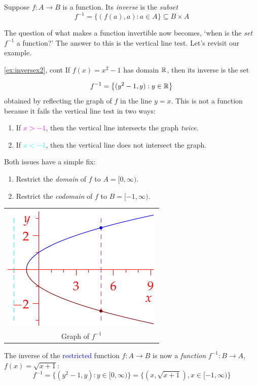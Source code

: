\begin{defn}{}{}
Suppose $f:A\to B$ is a function. Its \emph{inverse} is the \emph{subset}
\[f^{-1}=\bigl\{(f(a),a):a\in A\bigr\}\subseteq B\times A\]
\end{defn}

The question of what makes a function invertible now becomes, `when is the \emph{set} $f^{-1}$ a function?' The answer to this is the vertical line test. Let's revisit our example.\par

\begin{example*}{\ref{ex:inversex2}, cont}{}
If $f(x)=x^2-1$ has domain $\mathbb{R}$, then its inverse is the set\par
\begin{minipage}[t]{0.65\linewidth}\vspace{-10pt}
\[f^{-1}=\bigl\{(y^2-1,y):y\in\mathbb{R}\bigr\}\]
obtained by reflecting the graph of $f$ in the line $y=x$. This is not a function because it fails the vertical line test in two ways:
\begin{enumerate}\itemsep2pt
  \item If \textcolor{magenta}{$x>-1$}, then the vertical line intersects the graph \emph{twice.}
  \item If \textcolor{cyan}{$x<-1$}, then the vertical line does not intersect the graph.
\end{enumerate}
Both issues have a simple fix:
\begin{enumerate}\itemsep2pt
  \item Restrict the \emph{domain} of $f$ to $A=[0,\infty)$.
  \item Restrict the \emph{codomain} of $f$ to $B=[-1,\infty)$.
\end{enumerate}
\end{minipage}\hfill\begin{minipage}[t]{0.34\linewidth}\vspace{-10pt}
\flushright\begin{tabular}{@{}c@{}}
\includegraphics{inverses-poly4}\\
Graph of $f^{-1}$
\end{tabular}
\end{minipage}\medbreak
The inverse of the \textcolor{blue}{restricted} function $f:A\to B$ is now a \emph{function} $f^{-1}:B\to A$, $f(x)=\sqrt{x+1}$:
\[f^{-1}=\bigl\{(y^2-1,y):y\in[0,\infty)\bigr\} =\bigl\{(x,\sqrt{x+1}),x\in[-1,\infty)\bigr\}\]
\end{example*}


